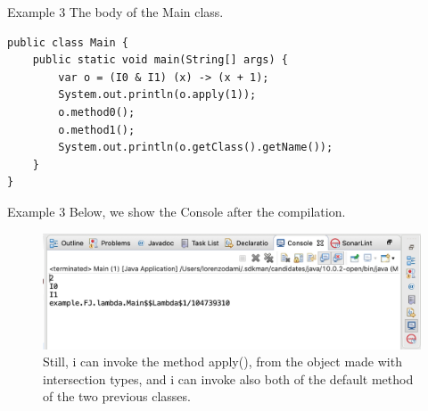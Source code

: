 \documentclass{beamer}
\begin{document}
\begin{frame}[fragile]{Example 3}
\boldmath
The body of the Main class.	
\begin{flushleft}
\begin{lstlisting}[basicstyle=\scriptsize]
public class Main {
	public static void main(String[] args) {
		var o = (I0 & I1) (x) -> (x + 1);
		System.out.println(o.apply(1));
		o.method0();
		o.method1();
		System.out.println(o.getClass().getName());
	}
}
\end{lstlisting}
\end{flushleft}
\end{frame}

\begin{frame}{Example 3}
Below, we show the Console after the compilation.
\begin{figure}
\centering
\includegraphics[width=1\linewidth]{images/downcast-java.png}
\caption{Still, i can invoke the method apply(), from the object made with intersection types, and i can invoke also both of the default method of the two previous classes.}
\label{fig:mainres}
\end{figure}
\end{frame}
\end{document}
